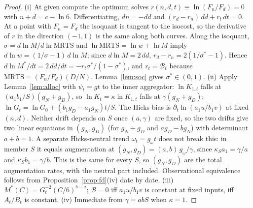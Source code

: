 \begin{proof}
(i) At given compute the optimum solves $r(n,d,t)\equiv\ln(F_n/F_d)=0$ with $n+d=c-\ln6$. Differentiating,
$dn=-dd$ and $(r_d-r_n)\,dd+r_t\,dt=0$. At a point with $F_n=F_d$ the isoquant is tangent to the isocost, so the
derivative of $r$ in the direction $(-1,1)$ is the same along both curves. Along the isoquant,
$\sigma=d\ln M/d\ln\mathrm{MRTS}$ and $\ln\mathrm{MRTS}=\ln w+\ln M$ imply $d\ln w=(1/\sigma-1)\,d\ln M$; since
$d\ln M=2\,dd$, $r_d-r_n=2(1/\sigma^*-1)$. Hence $d\ln M^*/dt=2\,dd/dt=-r_t\sigma^*/(1-\sigma^*)$, and $r_t=\mathcal B_t$ because
$\mathrm{MRTS}=(F_n/F_d)(D/N)$. Lemma~\ref{lem:soc} gives $\sigma^*\in(0,1)$.
(ii) Apply Lemma~\ref{lem:alloc} with $\psi_t=g t$ to the inner aggregator: $\ln K_{1,t}$ falls at
$(a_1b_1/S)(g_N+g_D)$, so $\ln K_t=\kappa\ln K_{1,t}$ falls at $\gamma(g_N+g_D)$; $\ln G_t=\ln G_0+(b_1g_D-a_1g_N)t/S$. The
Hicks bias is $\partial_t\ln(a_1u/b_1v)$ at fixed $(n,d)$. Neither drift depends on $S$ once $(a,\gamma)$ are fixed, so
the two drifts give two linear equations in $(g_N,g_D)$ (for $g_N+g_D$ and $ag_D-bg_N$) with determinant $a+b=1$. A separate
Hicks-neutral trend $\omega_t=g_\omega t$ does not break this: in member $S$ it equals augmentation at
$(g_N,g_D)=(a,b)\,g_\omega/\gamma$, since $\kappa_Sa_1=\gamma/a$ and $\kappa_Sb_1=\gamma/b$. This is the same for every $S$, so
$(g_N,g_D)$ are the total augmentation rates, with the neutral part included. Observational equivalence follows
from Proposition~\ref{prop:fd}(iv) date by date. (iii) $M^*(C)=G_t^{-2}(C/6)^{b-a}$; $\mathcal B=0$ iff $a_1u/b_1v$ is constant
at fixed inputs, iff $A_t/B_t$ is constant. (iv) Immediate from $\gamma=abS$ when $\kappa=1$.
\end{proof}

